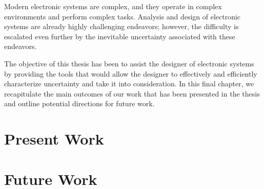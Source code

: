 Modern electronic systems are complex, and they operate in complex environments
and perform complex tasks. Analysis and design of electronic systems are already
highly challenging endeavors; however, the difficulty is escalated even further
by the inevitable uncertainty associated with these endeavors.

The objective of this thesis has been to assist the designer of electronic
systems by providing the tools that would allow the designer to effectively and
efficiently characterize uncertainty and take it into consideration. In this
final chapter, we recapitulate the main outcomes of our work that has been
presented in the thesis and outline potential directions for future work.

\section{Present Work}

\section{Future Work}
